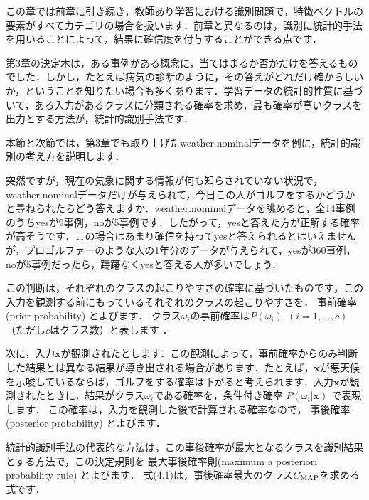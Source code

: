 
この章では前章に引き続き，教師あり学習における識別問題で，特徴ベクトルの要素がすべてカテゴリの場合を扱います．前章と異なるのは，識別に統計的手法を用いることによって，結果に確信度を付与することができる点です．


第3章の決定木は，ある事例がある概念に，当てはまるか否かだけを答えるものでした．しかし，たとえば病気の診断のように，その答えがどれだけ確からしいか，ということを知りたい場合も多くあります．学習データの統計的性質に基づいて，ある入力があるクラスに分類される確率を求め，最も確率が高いクラスを出力とする方法が，統計的識別手法です．

本節と次節では，第3章でも取り上げたweather.nominalデータを例に，統計的識別の考え方を説明します．


突然ですが，現在の気象に関する情報が何も知らされていない状況で，weather.nominalデータだけが与えられて，今日この人がゴルフをするかどうかと尋ねられたらどう答えますか．weather.nominalデータを眺めると，全14事例のうちyesが9事例，noが5事例です．したがって，yesと答えた方が正解する確率が高そうです．この場合はあまり確信を持ってyesと答えられるとはいえませんが，プロゴルファーのような人の1年分のデータが与えられて，yesが360事例，noが5事例だったら，躊躇なくyesと答える人が多いでしょう．

この判断は，それぞれのクラスの起こりやすさの確率に基づいたものです，この入力を観測する前にもっているそれぞれのクラスの起こりやすさを，
事前確率 (prior probability) 
とよびます．
クラス$\omega_i$の事前確率は$P(\omega_i) ~~ (i=1,\dots,c)$ （ただし$c$はクラス数）と表します
．


次に，入力$\bm{x}$が観測されたとします．この観測によって，事前確率からのみ判断した結果とは異なる結果が導き出される場合があります．たとえば，$\bm{x}$が悪天候を示唆しているならば，ゴルフをする確率は下がると考えられます．入力$\bm{x}$が観測されたときに，結果がクラス$\omega_i$である確率を，条件付き確率 $P(\omega_i \vert \bm{x})$ で表現します．
この確率は，入力を観測した後で計算される確率なので，
事後確率 (posterior probability) 
とよびます．

統計的識別手法の代表的な方法は，この事後確率が最大となるクラスを識別結果とする方法で，この決定規則を
最大事後確率則(maximum a posteriori probability rule)
とよびます．
式(4.1)は，事後確率最大のクラス$C_{\mbox{\scriptsize{MAP}}}$を求める式です．



